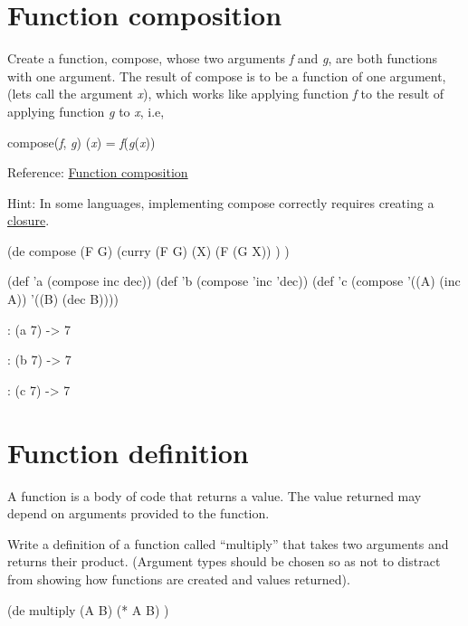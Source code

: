 \pagebreak{}
\section*{Function composition}

Create a function, compose, whose two arguments \emph{f} and \emph{g},
are both functions with one argument. The result of compose is to be a
function of one argument, (lets call the argument \emph{x}), which works
like applying function \emph{f} to the result of applying function
\emph{g} to \emph{x}, i.e,

compose(\emph{f}, \emph{g}) (\emph{x}) = \emph{f}(\emph{g}(\emph{x}))

Reference:
\href{http://en.wikipedia.org/wiki/Function\_composition\_(computer\_science)}{Function
composition}

Hint: In some languages, implementing compose correctly requires
creating a
\href{http://en.wikipedia.org/wiki/Closure\_(computer\_science)}{closure}.


\begin{wideverbatim}

(de compose (F G)
   (curry (F G) (X)
      (F (G X)) ) )

(def 'a (compose inc dec))
(def 'b (compose 'inc 'dec))
(def 'c (compose '((A) (inc A)) '((B) (dec B))))

: (a 7)
-> 7

: (b 7)
-> 7

: (c 7)
-> 7

\end{wideverbatim}

\pagebreak{}
\section*{Function definition}

A function is a body of code that returns a value. The value returned
may depend on arguments provided to the function.

Write a definition of a function called ``multiply'' that takes two
arguments and returns their product. (Argument types should be chosen so
as not to distract from showing how functions are created and values
returned).

\begin{wideverbatim}

(de multiply (A B)
   (* A B) )

\end{wideverbatim}

